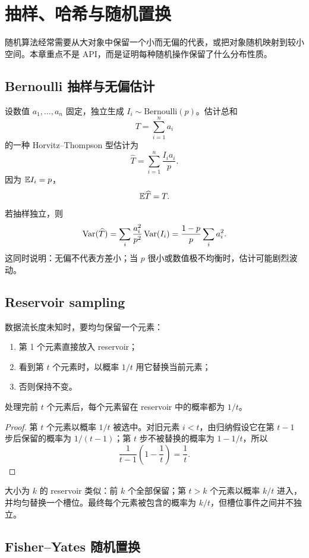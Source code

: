\chapter{抽样、哈希与随机置换}

随机算法经常需要从大对象中保留一个小而无偏的代表，或把对象随机映射到较小空间。本章重点不是 API，而是证明每种随机操作保留了什么分布性质。

\section{Bernoulli 抽样与无偏估计}

设数值 $a_1,\dots,a_n$ 固定，独立生成 $I_i\sim\mathrm{Bernoulli}(p)$。估计总和
\[
T=\sum_{i=1}^na_i
\]
的一种 Horvitz--Thompson 型估计为
\[
\widehat T=\sum_{i=1}^n\frac{I_i a_i}{p}.
\]
因为 $\mathbb{E} I_i=p$，
\[
\mathbb{E}\widehat T=T.
\]
若抽样独立，则
\[
\operatorname{Var}(\widehat T)
=\sum_i\frac{a_i^2}{p^2}\operatorname{Var}(I_i)
=\frac{1-p}{p}\sum_i a_i^2.
\]
这同时说明：无偏不代表方差小；当 $p$ 很小或数值极不均衡时，估计可能剧烈波动。

\section{Reservoir sampling}

数据流长度未知时，要均匀保留一个元素：
\begin{enumerate}
  \item 第 1 个元素直接放入 reservoir；
  \item 看到第 $t$ 个元素时，以概率 $1/t$ 用它替换当前元素；
  \item 否则保持不变。
\end{enumerate}

\begin{theorem}
处理完前 $t$ 个元素后，每个元素留在 reservoir 中的概率都为 $1/t$。
\end{theorem}

\begin{proof}
第 $t$ 个元素以概率 $1/t$ 被选中。对旧元素 $i<t$，由归纳假设它在第 $t-1$ 步后保留的概率为 $1/(t-1)$；第 $t$ 步不被替换的概率为 $1-1/t$，所以
\[
\frac1{t-1}\left(1-\frac1t\right)=\frac1t.
\]
\end{proof}

大小为 $k$ 的 reservoir 类似：前 $k$ 个全部保留；第 $t>k$ 个元素以概率 $k/t$ 进入，并均匀替换一个槽位。最终每个元素被包含的概率为 $k/t$，但槽位事件之间并不独立。

\section{Fisher--Yates 随机置换}

